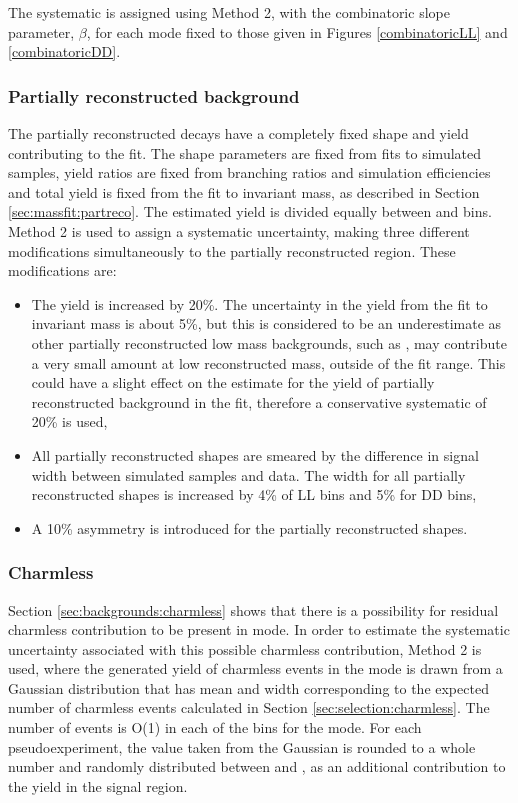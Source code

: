 The systematic is assigned using Method 2, with the combinatoric slope parameter, $\beta$, for each \Dz mode fixed to those given in Figures \ref{combinatoricLL} and \ref{combinatoricDD}.

\subsubsection{Partially reconstructed background}
\label{sec:systematics:partreco}

The partially reconstructed decays have a completely fixed shape and yield contributing to the \CP fit. The shape parameters are fixed from fits to simulated samples, yield ratios are fixed from branching ratios and simulation efficiencies and total yield is fixed from the fit to \kpi invariant mass, as described in Section \ref{sec:massfit:partreco}. The estimated yield is divided equally between \Bp and \Bm bins. Method 2 is used to assign a systematic uncertainty, making three different modifications simultaneously to the partially reconstructed region. These modifications are:

\begin{itemize}
\item The yield is increased by 20\%. The uncertainty in the yield from the fit to \kpi invariant mass is about 5\%, but this is considered to be an underestimate as other partially reconstructed low mass backgrounds, such as \decay{\Bm}{\D\Kstarm\piz}, may contribute a very small amount at low reconstructed \Bm mass, outside of the \CP fit range. This could have a slight effect on the estimate for the yield of partially reconstructed background in the \CP fit, therefore a conservative systematic of 20\% is used,
\item All partially reconstructed shapes are smeared by the difference in signal width between simulated samples and data. The width for all partially reconstructed shapes is increased by 4\% of LL bins and 5\% for DD bins,
\item A 10\% asymmetry is introduced for the partially reconstructed shapes.
\end{itemize}

\subsubsection{Charmless}

Section \ref{sec:backgrounds:charmless} shows that there is a possibility for residual charmless contribution to be present in \pipi mode. In order to estimate the systematic uncertainty associated with this possible charmless contribution, Method 2 is used, where the generated yield of charmless events in the \pipi mode is drawn from a Gaussian distribution that has mean and width corresponding to the expected number of charmless events calculated in Section \ref{sec:selection:charmless}. The number of events is O(1) in each of the bins for the \pipi mode. For each pseudoexperiment, the value taken from the Gaussian is rounded to a whole number and randomly distributed between \Bp and \Bm, as an additional contribution to the yield in the signal region. 

